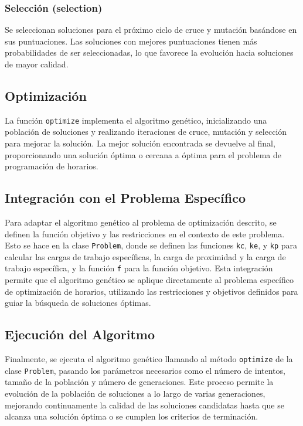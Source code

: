 \documentclass{article}
\begin{document}
\subsubsection{Selección (selection)}

Se seleccionan soluciones para el próximo ciclo de cruce y mutación basándose en sus puntuaciones. Las soluciones con mejores puntuaciones tienen más probabilidades de ser seleccionadas, lo que favorece la evolución hacia soluciones de mayor calidad.

\subsection{Optimización}

La función \texttt{optimize} implementa el algoritmo genético, inicializando una población de soluciones y realizando iteraciones de cruce, mutación y selección para mejorar la solución. La mejor solución encontrada se devuelve al final, proporcionando una solución óptima o cercana a óptima para el problema de programación de horarios.

\subsection{Integración con el Problema Específico}

Para adaptar el algoritmo genético al problema de optimización descrito, se definen la función objetivo y las restricciones en el contexto de este problema. Esto se hace en la clase \texttt{Problem}, donde se definen las funciones \texttt{kc}, \texttt{ke}, y \texttt{kp} para calcular las cargas de trabajo específicas, la carga de proximidad y la carga de trabajo específica, y la función \texttt{f} para la función objetivo. Esta integración permite que el algoritmo genético se aplique directamente al problema específico de optimización de horarios, utilizando las restricciones y objetivos definidos para guiar la búsqueda de soluciones óptimas.

\subsection{Ejecución del Algoritmo}

Finalmente, se ejecuta el algoritmo genético llamando al método \texttt{optimize} de la clase \texttt{Problem}, pasando los parámetros necesarios como el número de intentos, tamaño de la población y número de generaciones. Este proceso permite la evolución de la población de soluciones a lo largo de varias generaciones, mejorando continuamente la calidad de las soluciones candidatas hasta que se alcanza una solución óptima o se cumplen los criterios de terminación. 
\end{document}
